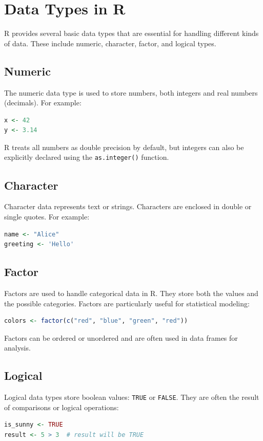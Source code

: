 \documentclass[10pt]{book}
\begin{document}
\section{Data Types in R}
R provides several basic data types that are essential for handling different kinds of data. These include numeric, character, factor, and logical types.

\subsection{Numeric}
The numeric data type is used to store numbers, both integers and real numbers (decimals). For example:
\begin{lstlisting}[language=R]
x <- 42
y <- 3.14
\end{lstlisting}
R treats all numbers as double precision by default, but integers can also be explicitly declared using the \texttt{as.integer()} function.

\subsection{Character}
Character data represents text or strings. Characters are enclosed in double or single quotes. For example:
\begin{lstlisting}[language=R]
name <- "Alice"
greeting <- 'Hello'
\end{lstlisting}

\subsection{Factor}
Factors are used to handle categorical data in R. They store both the values and the possible categories. Factors are particularly useful for statistical modeling:
\begin{lstlisting}[language=R]
colors <- factor(c("red", "blue", "green", "red"))
\end{lstlisting}
Factors can be ordered or unordered and are often used in data frames for analysis.

\subsection{Logical}
Logical data types store boolean values: \texttt{TRUE} or \texttt{FALSE}. They are often the result of comparisons or logical operations:
\begin{lstlisting}[language=R]
is_sunny <- TRUE
result <- 5 > 3  # result will be TRUE
\end{lstlisting}
\end{document}
